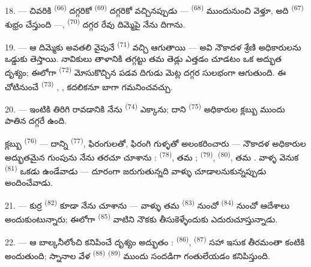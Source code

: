 18. --- చివరికి  \textsuperscript{(66)} దగ్గరికో 
\textsuperscript{(69)} దగ్గరికో వచ్చినప్పుడు — 
\textsuperscript{(68)} ముందునుంచి వెళ్తూ, అది  \textsuperscript{(67)}
శుభ్రం చేస్తుంది —,  \textsuperscript{(70)} దగ్గర రేవు దిమ్మెపై నేను
దిగాను.

19. --- ఆ దిమ్మెకు అవతలి వైపునే  \textsuperscript{(71)} వచ్చి ఆగుతాయి —
అవి నౌకాదళ శ్రేణి అధికారులను ఒడ్డుకు తెస్తాయి. నావికులు తాళానికి తగ్గట్టు తమ తెడ్లు ఎత్తడం
చూడటం ఒక అద్భుత దృశ్యం; ఈలోగా  \textsuperscript{(72)} మోసుకొచ్చిన పడవ దిగుడు మెట్ల
దగ్గర సులభంగా ఆగుతుంది. ఈ చోటినుంచే  \textsuperscript{(73)}
, ,  కదలికనూ బాగా గమనించవచ్చు.

\VUsaut{5.0mm}
\VUsaut{3.4mm}

20. --- ఇంటికి తిరిగి రావడానికి నేను  \textsuperscript{(74)}
ఎక్కాను; దాని  \textsuperscript{(75)} అధికారుల క్లబ్బు ముందు పాతిన
 దగ్గరే ఉంది.

క్లబ్బు  \textsuperscript{(76)} — దాన్ని 
\textsuperscript{(77)}, ఫిరంగులతో, ఫిరంగి గుళ్ళతో అలంకరించారు — నౌకాదళ అధికారుల అద్భుతమైన
గుంపును నేను తరచూ చూశాను :  \textsuperscript{(78)}, తమ
;  \textsuperscript{(79)},
 \textsuperscript{(80)}, తమ . వాళ్ళ వెనుక
 \textsuperscript{(81)} ఒకడు ఉండేవాడు — దూరంగా జరుగుతున్నది వాళ్ళు
చూడాలనుకున్నప్పుడు  అందించేవాడు.

21. --- కుర్ర  \textsuperscript{(82)} కూడా నేను చూశాను — వాళ్ళు
తమ  \textsuperscript{(83)} నుంచో  \textsuperscript{(84)}
నుంచో ఆదేశాలు అందుకుంటున్నారు; ఈలోగా  \textsuperscript{(85)} వాటిని
నౌకకు తీసుకెళ్ళేందుకు ఎదురుచూస్తున్నాడు.

22. --- ఆ బాల్కనీలోంచి కనిపించే దృశ్యం అద్భుతం : 
\textsuperscript{(86)},  \textsuperscript{(87)} సహా ఇసుక తీరమంతా కంటికి
అందుతుంది; స్నానాల వేళ  \textsuperscript{(88)} 
\textsuperscript{(89)} ముందు సందడిగా గంతులేయడం కనిపిస్తుంది.

